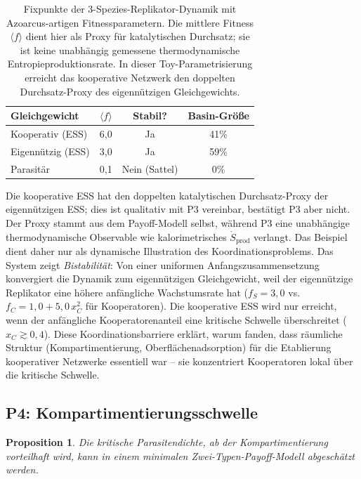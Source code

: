 \documentclass[12pt,a4paper]{article}
\newtheorem{proposition}{Proposition}
\theoremstyle{remark}
\begin{document}
\begin{table}[htbp]
\centering
\caption{Fixpunkte der 3-Spezies-Replikator-Dynamik mit Azoarcus-artigen Fitnessparametern. Die mittlere Fitness $\langle f \rangle$ dient hier als Proxy für katalytischen Durchsatz; sie ist keine unabhängig gemessene thermodynamische Entropieproduktionsrate. In dieser Toy-Parametrisierung erreicht das kooperative Netzwerk den doppelten Durchsatz-Proxy des eigennützigen Gleichgewichts.}
\label{tab:replicator-fps}
\begin{tabular}{lccc}
\toprule
\textbf{Gleichgewicht} & $\langle f \rangle$ & \textbf{Stabil?} & \textbf{Basin-Größe} \\
\midrule
Kooperativ (ESS) & 6{,}0 & Ja & 41\% \\
Eigennützig (ESS) & 3{,}0 & Ja & 59\% \\
Parasitär & 0{,}1 & Nein (Sattel) & 0\% \\
\bottomrule
\end{tabular}
\end{table}

Die kooperative ESS hat den doppelten katalytischen Durchsatz-Proxy der eigennützigen ESS; dies ist qualitativ mit P3 vereinbar, bestätigt P3 aber nicht. Der Proxy stammt aus dem Payoff-Modell selbst, während P3 eine unabhängige thermodynamische Observable wie kalorimetrisches $\dot{S}_{\mathrm{prod}}$ verlangt. Das Beispiel dient daher nur als dynamische Illustration des Koordinationsproblems. Das System zeigt \emph{Bistabilität}: Von einer uniformen Anfangszusammensetzung konvergiert die Dynamik zum eigennützigen Gleichgewicht, weil der eigennützige Replikator eine höhere anfängliche Wachstumsrate hat ($f_S = 3{,}0$ vs.\ $f_C = 1{,}0 + 5{,}0 \, x_C^2$ für Kooperatoren). Die kooperative ESS wird nur erreicht, wenn der anfängliche Kooperatorenanteil eine kritische Schwelle überschreitet ($x_C \gtrsim 0{,}4$). Diese Koordinationsbarriere erklärt, warum \citet{AzoarcusPMC} fanden, dass räumliche Struktur (Kompartimentierung, Oberflächenadsorption) für die Etablierung kooperativer Netzwerke essentiell war -- sie konzentriert Kooperatoren lokal über die kritische Schwelle.

\subsection{P4: Kompartimentierungsschwelle}

\begin{proposition}
Die kritische Parasitendichte, ab der Kompartimentierung vorteilhaft wird, kann in einem minimalen Zwei-Typen-Payoff-Modell abgeschätzt werden.
\end{proposition}
\end{document}
